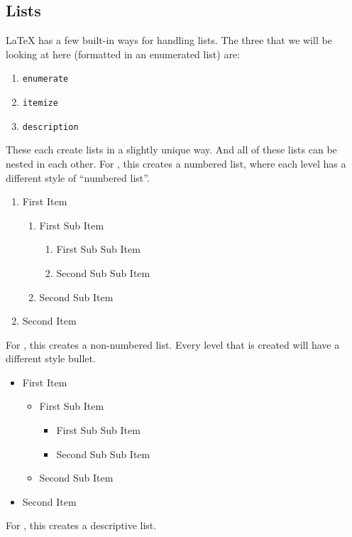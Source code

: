 		\subsection{Lists}
			\LaTeX{} has a few built-in ways for handling lists.
			The three that we will be looking at here (formatted in an enumerated list) are:
			\begin{enumerate}
				\item \lstinline|enumerate|
				\item \lstinline|itemize|
				\item \lstinline|description|
			\end{enumerate}
			These each create lists in a slightly unique way.
			And all of these lists can be nested in each other.
			For , this creates a numbered list, where each level has a different style of \enquote{numbered list}.
			\begin{enumerate}
				\item First Item
					\begin{enumerate}
						\item First Sub Item
							\begin{enumerate}
								\item First Sub Sub Item
								\item Second Sub Sub Item
							\end{enumerate}
						\item Second Sub Item
					\end{enumerate}
				\item Second Item
			\end{enumerate}
			For , this creates a non-numbered list.
			Every level that is created will have a different style bullet.
			\begin{itemize}
				\item First Item
					\begin{itemize}
						\item First Sub Item
							\begin{itemize}
								\item First Sub Sub Item
								\item Second Sub Sub Item
							\end{itemize}
						\item Second Sub Item
					\end{itemize}
				\item Second Item
			\end{itemize}
			For , this creates a descriptive list.
